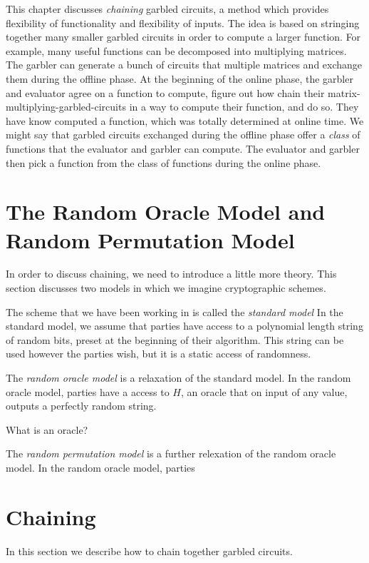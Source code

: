This chapter discusses \textit{chaining} garbled circuits, a method which provides flexibility of functionality and flexibility of inputs.
The idea is based on stringing together many smaller garbled circuits in order to compute a larger function.
For example, many useful functions can be decomposed into multiplying matrices.
The garbler can generate a bunch of circuits that multiple matrices and exchange them during the offline phase.
At the beginning of the online phase, the garbler and evaluator agree on a function to compute, figure out how chain their matrix-multiplying-garbled-circuits in a way to compute their function, and do so.
They have know computed a function, which was totally determined at online time.
We might say that garbled circuits exchanged during the offline phase offer a \textit{class} of functions that the evaluator and garbler can compute.
The evaluator and garbler then pick a function from the class of functions during the online phase.

\section{The Random Oracle Model and Random Permutation Model}
In order to discuss chaining, we need to introduce a little more theory.
This section discusses two models in which we imagine cryptographic schemes.

The scheme that we have been working in is called the \textit{standard model} 
In the standard model, we assume that parties have access to a polynomial length string of random bits, preset at the beginning of their algorithm.
This string can be used however the parties wish, but it is a static access of randomness.

The \textit{random oracle model} is a relaxation of the standard model.
In the random oracle model, parties have a access to $H$, an oracle that on input of any value, outputs a perfectly random string. 

What is an oracle?

The \textit{random permutation model} is a further relexation of the random oracle model.
In the random oracle model, parties

\section{Chaining}
In this section we describe how to chain together garbled circuits.


